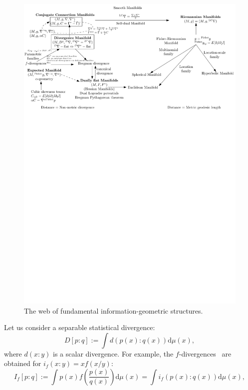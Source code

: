 \documentclass[graybox]{svmult}
\def\dmu{\mathrm{d}\mu}
\def\eqdef{:=}
\begin{document}
\begin{figure}%
\centering
\includegraphics[width=\columnwidth]{Fig-IGManifold.pdf}%

\caption{The web of fundamental information-geometric structures.
 }%
\label{fig:igfund}%
\end{figure}

Let us consider a separable statistical divergence:
\begin{equation}\label{eq:statdiv}
D[p:q] \eqdef \int d(p(x):q(x)) \dmu(x),
\end{equation}
where $d(x:y)$ is a scalar divergence.
For example, the $f$-divergences~\cite{IG-2016} are obtained for $i_f(x:y)=x f(x/y)$:
\begin{equation}
I_f[p:q] \eqdef \int p(x) f\left(\frac{p(x)}{q(x)}\right) \dmu(x) = \int i_f(p(x):q(x))\dmu(x),
\end{equation}
\end{document}
